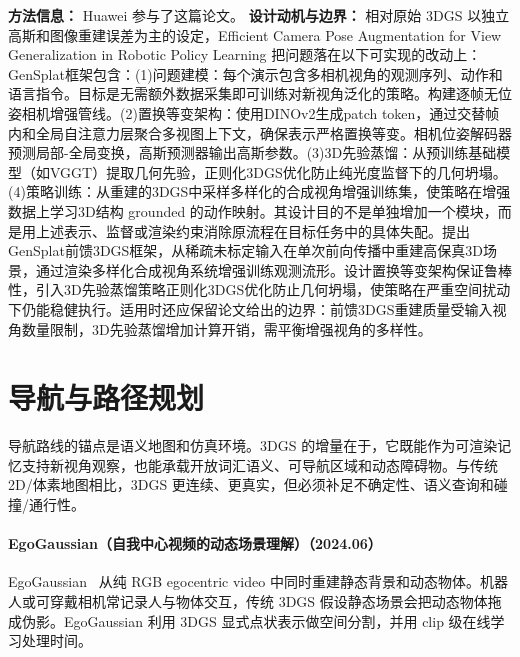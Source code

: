 \textbf{方法信息：} Huawei 参与了这篇论文。
\textbf{设计动机与边界：} 相对原始 3DGS 以独立高斯和图像重建误差为主的设定，Efficient Camera Pose Augmentation for View Generalization in Robotic Policy Learning 把问题落在以下可实现的改动上：GenSplat框架包含：(1)问题建模：每个演示包含多相机视角的观测序列、动作和语言指令。目标是无需额外数据采集即可训练对新视角泛化的策略。构建逐帧无位姿相机增强管线。(2)置换等变架构：使用DINOv2生成patch token，通过交替帧内和全局自注意力层聚合多视图上下文，确保表示严格置换等变。相机位姿解码器预测局部-全局变换，高斯预测器输出高斯参数。(3)3D先验蒸馏：从预训练基础模型（如VGGT）提取几何先验，正则化3DGS优化防止纯光度监督下的几何坍塌。(4)策略训练：从重建的3DGS中采样多样化的合成视角增强训练集，使策略在增强数据上学习3D结构 grounded 的动作映射。其设计目的不是单独增加一个模块，而是用上述表示、监督或渲染约束消除原流程在目标任务中的具体失配。提出GenSplat前馈3DGS框架，从稀疏未标定输入在单次前向传播中重建高保真3D场景，通过渲染多样化合成视角系统增强训练观测流形。设计置换等变架构保证鲁棒性，引入3D先验蒸馏策略正则化3DGS优化防止几何坍塌，使策略在严重空间扰动下仍能稳健执行。适用时还应保留论文给出的边界：前馈3DGS重建质量受输入视角数量限制，3D先验蒸馏增加计算开销，需平衡增强视角的多样性。

\section{导航与路径规划}

导航路线的锚点是语义地图和仿真环境。3DGS 的增量在于，它既能作为可渲染记忆支持新视角观察，也能承载开放词汇语义、可导航区域和动态障碍物。与传统 2D/体素地图相比，3DGS 更连续、更真实，但必须补足不确定性、语义查询和碰撞/通行性。
\paragraph{EgoGaussian（自我中心视频的动态场景理解）（2024.06）}
EgoGaussian~\cite{2406_19811} 从纯 RGB egocentric video 中同时重建静态背景和动态物体。机器人或可穿戴相机常记录人与物体交互，传统 3DGS 假设静态场景会把动态物体拖成伪影。EgoGaussian 利用 3DGS 显式点状表示做空间分割，并用 clip 级在线学习处理时间。

